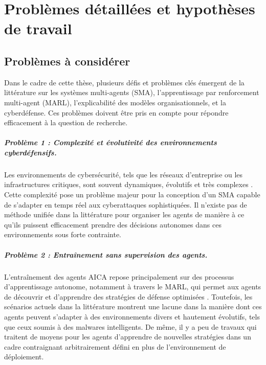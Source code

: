 \chapter{Problèmes détaillées et hypothèses de travail}\label{ch:problem}


\section{Problèmes à considérer}

Dans le cadre de cette thèse, plusieurs défis et problèmes clés émergent de la littérature sur les systèmes multi-agents (SMA), l’apprentissage par renforcement multi-agent (MARL), l'explicabilité des modèles organisationnels, et la cyberdéfense. Ces problèmes doivent être pris en compte pour répondre efficacement à la question de recherche.

\paragraph{Problème 1 : Complexité et évolutivité des environnements cyberdéfensifs.}
Les environnements de cybersécurité, tels que les réseaux d'entreprise ou les infrastructures critiques, sont souvent dynamiques, évolutifs et très complexes \cite{Calo2017, Kott2019}. Cette complexité pose un problème majeur pour la conception d'un SMA capable de s'adapter en temps réel aux cyberattaques sophistiquées. Il n'existe pas de méthode unifiée dans la littérature pour organiser les agents de manière à ce qu'ils puissent efficacement prendre des décisions autonomes dans ces environnements sous forte contrainte.

\paragraph{Problème 2 : Entraînement sans supervision des agents.}
L'entraînement des agents AICA repose principalement sur des processus d'apprentissage autonome, notamment à travers le MARL, qui permet aux agents de découvrir et d'apprendre des stratégies de défense optimisées \cite{Jamont2015, Theron2020}. Toutefois, les scénarios actuels dans la littérature montrent une lacune dans la manière dont ces agents peuvent s'adapter à des environnements divers et hautement évolutifs, tels que ceux soumis à des malwares intelligents. De même, il y a peu de travaux qui traitent de moyens pour les agents d'apprendre de nouvelles stratégies dans un cadre contraignant arbitrairement défini en plus de l'environnement de déploiement.


